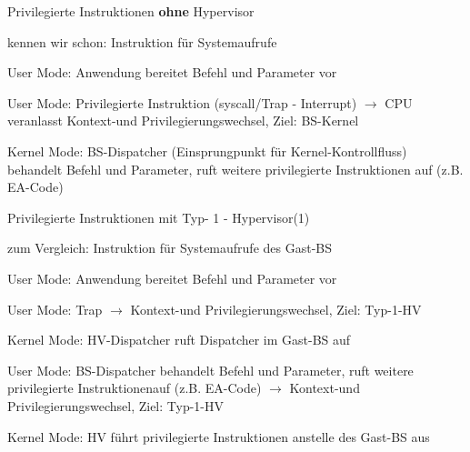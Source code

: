 \documentclass[a4paper]{article}
\begin{document}
\begin{multicols}{3}
    Privilegierte Instruktionen \textbf{ohne} Hypervisor

    \begin{itemize*}
        \item kennen wir schon: Instruktion für Systemaufrufe
    \end{itemize*}

    \begin{enumerate*}
        \item User Mode: Anwendung bereitet Befehl und Parameter vor
        \item User Mode: Privilegierte Instruktion (syscall/Trap - Interrupt)
        $\rightarrow$ CPU veranlasst Kontext-und
        Privilegierungswechsel, Ziel: BS-Kernel
        \item Kernel Mode: BS-Dispatcher (Einsprungpunkt für Kernel-Kontrollfluss)
        behandelt Befehl und Parameter, ruft weitere privilegierte
        Instruktionen auf (z.B. EA-Code)
    \end{enumerate*}


    Privilegierte Instruktionen mit Typ- 1 - Hypervisor(1)

    \begin{itemize*}
        \item zum Vergleich: Instruktion für Systemaufrufe des Gast-BS
    \end{itemize*}

    \begin{enumerate*}
        \item User Mode: Anwendung bereitet Befehl und Parameter vor
        \item User Mode: Trap $\rightarrow$ Kontext-und
        Privilegierungswechsel, Ziel: Typ-1-HV
        \item Kernel Mode: HV-Dispatcher ruft Dispatcher im Gast-BS auf
        \item User Mode: BS-Dispatcher behandelt Befehl und Parameter, ruft weitere
        privilegierte Instruktionenauf (z.B. EA-Code)
        $\rightarrow$ Kontext-und Privilegierungswechsel,
        Ziel: Typ-1-HV
        \item Kernel Mode: HV führt privilegierte Instruktionen anstelle des Gast-BS
        aus
    \end{enumerate*}




\end{multicols}
\end{document}
